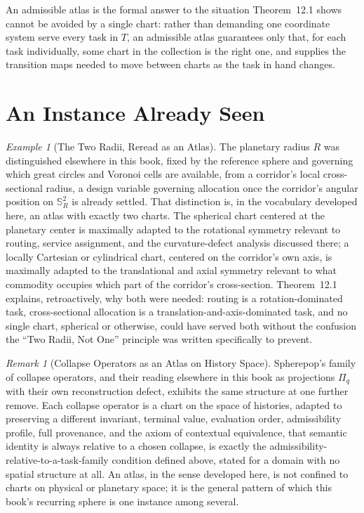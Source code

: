 \documentclass[11pt,fleqn]{book}
\numberwithin{equation}{chapter}
\theoremstyle{plain}
\theoremstyle{definition}
\theoremstyle{remark}
\newtheorem{remark}[theorem]{Remark}
\newtheorem{example}[theorem]{Example}
\newcommand{\Sphere}{\mathbb{S}^{2}}
\providecommand{\enquote}[1]{``#1''}
\begin{document}
An admissible atlas is the formal answer to the situation Theorem~12.1 shows cannot be avoided by a single chart: rather than demanding one coordinate system serve every task in \(T\), an admissible atlas guarantees only that, for each task individually, some chart in the collection is the right one, and supplies the transition maps needed to move between charts as the task in hand changes.

\section{An Instance Already Seen}

\begin{example}[The Two Radii, Reread as an Atlas]
The planetary radius \(R\) was distinguished elsewhere in this book, fixed by the reference sphere and governing which great circles and Voronoi cells are available, from a corridor's local cross-sectional radius, a design variable governing allocation once the corridor's angular position on \(\Sphere_R\) is already settled. That distinction is, in the vocabulary developed here, an atlas with exactly two charts. The spherical chart centered at the planetary center is maximally adapted to the rotational symmetry relevant to routing, service assignment, and the curvature-defect analysis discussed there; a locally Cartesian or cylindrical chart, centered on the corridor's own axis, is maximally adapted to the translational and axial symmetry relevant to what commodity occupies which part of the corridor's cross-section. Theorem~12.1 explains, retroactively, why both were needed: routing is a rotation-dominated task, cross-sectional allocation is a translation-and-axis-dominated task, and no single chart, spherical or otherwise, could have served both without the confusion the \enquote{Two Radii, Not One} principle was written specifically to prevent.
\end{example}

\begin{remark}[Collapse Operators as an Atlas on History Space]
Spherepop's family of collapse operators, and their reading elsewhere in this book as projections \(\Pi_q\) with their own reconstruction defect, exhibits the same structure at one further remove. Each collapse operator is a chart on the space of histories, adapted to preserving a different invariant, terminal value, evaluation order, admissibility profile, full provenance, and the axiom of contextual equivalence, that semantic identity is always relative to a chosen collapse, is exactly the admissibility-relative-to-a-task-family condition defined above, stated for a domain with no spatial structure at all. An atlas, in the sense developed here, is not confined to charts on physical or planetary space; it is the general pattern of which this book's recurring sphere is one instance among several.
\end{remark}
\end{document}

